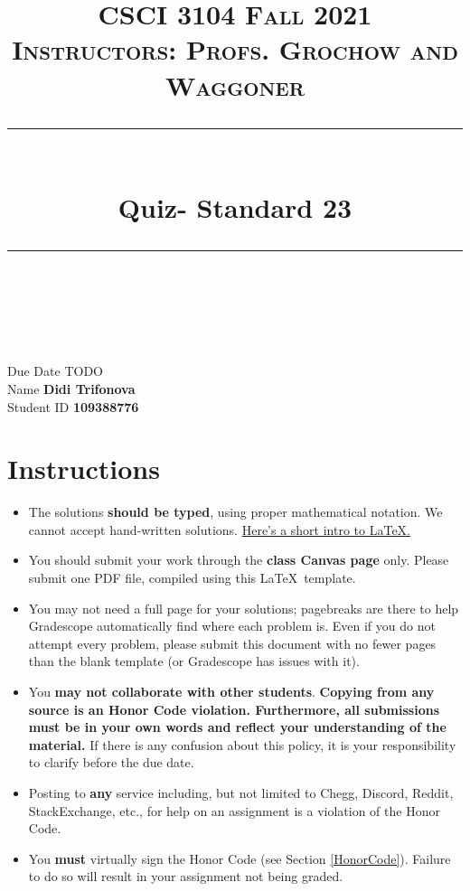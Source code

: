 \documentclass[11pt]{article}
\title{
\normalfont \normalsize 
\textsc{CSCI 3104 Fall 2021 \\ 
Instructors: Profs. Grochow and Waggoner} \\
[10pt] 
\rule{\linewidth}{0.5pt} \\[6pt] 
\huge Quiz- Standard 23 \\
\rule{\linewidth}{2pt}  \\[10pt]
}
\date{}
\theoremstyle{definition}
\theoremstyle{definition}
\theoremstyle{definition}
\begin{document}

\maketitle


\noindent
Due Date \dotfill TODO \\
Name \dotfill \textbf{Didi Trifonova} \\
Student ID \dotfill \textbf{109388776} \\


\tableofcontents

\section{Instructions}
 \begin{itemize}
	\item The solutions \textbf{should be typed}, using proper mathematical notation. We cannot accept hand-written solutions. \href{http://ece.uprm.edu/~caceros/latex/introduction.pdf}{Here's a short intro to \LaTeX.}
	\item You should submit your work through the \textbf{class Canvas page} only. Please submit one PDF file, compiled using this \LaTeX \ template.
	\item You may not need a full page for your solutions; pagebreaks are there to help Gradescope automatically find where each problem is. Even if you do not attempt every problem, please submit this document with no fewer pages than the blank template (or Gradescope has issues with it).

	\item You \textbf{may not collaborate with other students}. \textbf{Copying from any source is an Honor Code violation. Furthermore, all submissions must be in your own words and reflect your understanding of the material.} If there is any confusion about this policy, it is your responsibility to clarify before the due date. 

	\item Posting to \textbf{any} service including, but not limited to Chegg, Discord, Reddit, StackExchange, etc., for help on an assignment is a violation of the Honor Code.

	\item You \textbf{must} virtually sign the Honor Code (see Section \ref{HonorCode}). Failure to do so will result in your assignment not being graded.
\end{itemize}
\end{document}

